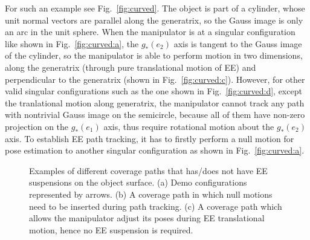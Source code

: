 \documentclass[Afour,sageh,times]{sagej}
\begin{document}
For such an example see Fig.~\ref{fig:curved}. 
The object is part of a cylinder, whose unit normal vectors are parallel along the generatrix, so the Gauss image is only an arc in the unit sphere. 
When the manipulator is at a singular configuration like shown in Fig.~\ref{fig:curved:a}, the $g_*(e_2)$ axis is tangent to the Gauss image of the cylinder, so the manipulator is able to perform motion in two dimensions, along the generatrix (through pure translational motion of EE) and perpendicular to the generatrix (shown in Fig.~\ref{fig:curved:c}). 
However, for other valid singular configurations such as the one shown in Fig.~\ref{fig:curved:d}, except the tranlational motion along generatrix, the manipulator cannot track any path with nontrivial Gauss image on the semicircle, because all of them have non-zero projection on the $g_*(e_1)$ axis, thus require rotational motion about the $g_*(e_2)$ axis. 
To establish EE path tracking, it has to firstly perform a null motion for pose estimation to another singular configuration as shown in Fig.~\ref{fig:curved:a}. 

\begin{figure}[t]
\centering
{}
\caption{Examples of different coverage paths that has/does not have EE suspensions on the object surface. 
(a) Demo configurations represented by arrows. 
(b) A coverage path in which null motions need to be inserted during path tracking. 
(c) A coverage path which allows the manipulator adjust its poses during EE translational motion, hence no EE suspension is required. }\label{fig:paths}
\end{figure}
\end{document}
